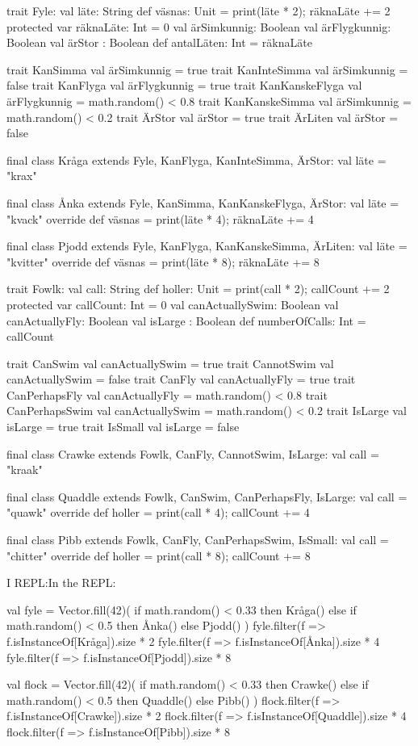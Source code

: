 \ifswedish
\begin{Code}
trait Fyle:
  val läte: String
  def väsnas: Unit = { print(läte * 2); räknaLäte += 2 }
  protected var räknaLäte: Int = 0
  val ärSimkunnig: Boolean
  val ärFlygkunnig: Boolean
  val ärStor : Boolean
  def antalLäten: Int = räknaLäte

trait KanSimma { val ärSimkunnig = true }
trait KanInteSimma { val ärSimkunnig = false }
trait KanFlyga { val ärFlygkunnig = true }
trait KanKanskeFlyga { val ärFlygkunnig = math.random() < 0.8 }
trait KanKanskeSimma { val ärSimkunnig = math.random() < 0.2 }
trait ÄrStor { val ärStor = true }
trait ÄrLiten { val ärStor = false }

final class Kråga extends Fyle, KanFlyga, KanInteSimma, ÄrStor:
  val läte = "krax"

final class Ånka extends Fyle, KanSimma, KanKanskeFlyga, ÄrStor:
  val läte = "kvack"
  override def väsnas = { print(läte * 4); räknaLäte += 4 }

final class Pjodd extends Fyle, KanFlyga, KanKanskeSimma, ÄrLiten:
  val läte = "kvitter"
  override def väsnas = { print(läte * 8); räknaLäte += 8 }
\end{Code}
\else
\begin{Code}
trait Fowlk:
  val call: String
  def holler: Unit = { print(call * 2); callCount += 2 }
  protected var callCount: Int = 0
  val canActuallySwim: Boolean
  val canActuallyFly: Boolean
  val isLarge : Boolean
  def numberOfCalls: Int = callCount

trait CanSwim { val canActuallySwim = true }
trait CannotSwim { val canActuallySwim = false }
trait CanFly { val canActuallyFly = true }
trait CanPerhapsFly { val canActuallyFly = math.random() < 0.8 }
trait CanPerhapsSwim { val canActuallySwim = math.random() < 0.2 }
trait IsLarge { val isLarge = true }
trait IsSmall { val isLarge = false }

final class Crawke extends Fowlk, CanFly, CannotSwim, IsLarge:
  val call = "kraak"

final class Quaddle extends Fowlk, CanSwim, CanPerhapsFly, IsLarge:
  val call = "quawk"
  override def holler = { print(call * 4); callCount += 4 }

final class Pibb extends Fowlk, CanFly, CanPerhapsSwim, IsSmall:
  val call = "chitter"
  override def holler = { print(call * 8); callCount += 8 }
\end{Code}
\fi

\ifswedish I REPL:\else In the REPL:\fi
\ifswedish
\begin{REPL}
val fyle = Vector.fill(42)(
  if math.random() < 0.33 then Kråga()
  else if math.random() < 0.5 then Ånka()
  else Pjodd()
)
fyle.filter(f => f.isInstanceOf[Kråga]).size * 2
fyle.filter(f => f.isInstanceOf[Ånka]).size * 4
fyle.filter(f => f.isInstanceOf[Pjodd]).size * 8
\end{REPL}
\else
\begin{REPL}
val flock = Vector.fill(42)(
  if math.random() < 0.33 then Crawke()
  else if math.random() < 0.5 then Quaddle()
  else Pibb()
)
flock.filter(f => f.isInstanceOf[Crawke]).size * 2
flock.filter(f => f.isInstanceOf[Quaddle]).size * 4
flock.filter(f => f.isInstanceOf[Pibb]).size * 8
\end{REPL}
\fi

